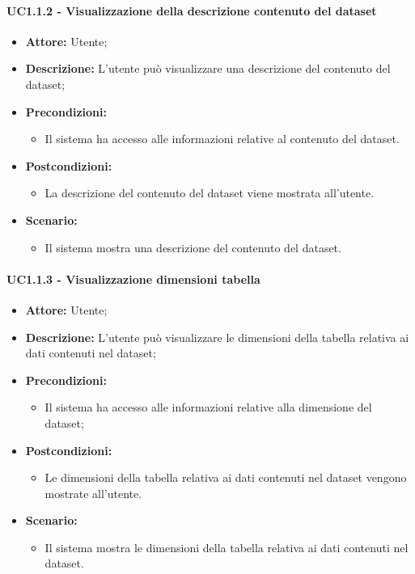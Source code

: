 \paragraph{UC1.1.2 - Visualizzazione della descrizione contenuto del dataset}
\begin{itemize}
    \item \textbf{Attore:} Utente;
    \item \textbf{Descrizione:} L'utente può visualizzare una descrizione del contenuto del dataset;
    \item \textbf{Precondizioni:}
    \begin{itemize}
        \item Il sistema ha accesso alle informazioni relative al contenuto del dataset.
    \end{itemize}
    \item \textbf{Postcondizioni:}
    \begin{itemize}
        \item La descrizione del contenuto del dataset viene mostrata all'utente.
    \end{itemize}
    \item \textbf{Scenario:}
    \begin{itemize}
        \item Il sistema mostra una descrizione del contenuto del dataset.
    \end{itemize}
\end{itemize}
\paragraph{UC1.1.3 - Visualizzazione dimensioni tabella}
\begin{itemize}
    \item \textbf{Attore:} Utente;
    \item \textbf{Descrizione:} L'utente può visualizzare le dimensioni della tabella relativa ai dati contenuti nel dataset;
    \item \textbf{Precondizioni:}
    \begin{itemize}
        \item Il sistema ha accesso alle informazioni relative alla dimensione del dataset;
    \end{itemize}
    \item \textbf{Postcondizioni:}
    \begin{itemize}
        \item Le dimensioni della tabella relativa ai dati contenuti nel dataset vengono mostrate all'utente.
    \end{itemize}
    \item \textbf{Scenario:}
    \begin{itemize}
        \item Il sistema mostra le dimensioni della tabella relativa ai dati contenuti nel dataset.
    \end{itemize}
\end{itemize}

